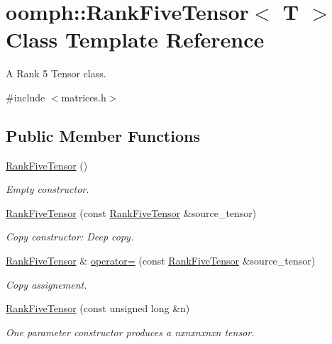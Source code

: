 \hypertarget{classoomph_1_1RankFiveTensor}{}\section{oomph\+:\+:Rank\+Five\+Tensor$<$ T $>$ Class Template Reference}
\label{classoomph_1_1RankFiveTensor}


A Rank 5 Tensor class.  




{\ttfamily \#include $<$matrices.\+h$>$}

\subsection*{Public Member Functions}
\begin{DoxyCompactItemize}
\item 
\hyperlink{classoomph_1_1RankFiveTensor_a388a9f191189d174e521d422e3bc44cd}{Rank\+Five\+Tensor} ()
\begin{DoxyCompactList}\small\item\em Empty constructor. \end{DoxyCompactList}\item 
\hyperlink{classoomph_1_1RankFiveTensor_a17aa636c6c8b4aa80ff4e168bca1881b}{Rank\+Five\+Tensor} (const \hyperlink{classoomph_1_1RankFiveTensor}{Rank\+Five\+Tensor} \&source\+\_\+tensor)
\begin{DoxyCompactList}\small\item\em Copy constructor\+: Deep copy. \end{DoxyCompactList}\item 
\hyperlink{classoomph_1_1RankFiveTensor}{Rank\+Five\+Tensor} \& \hyperlink{classoomph_1_1RankFiveTensor_a3972e47b50ce31ec0317862ce1e18884}{operator=} (const \hyperlink{classoomph_1_1RankFiveTensor}{Rank\+Five\+Tensor} \&source\+\_\+tensor)
\begin{DoxyCompactList}\small\item\em Copy assignement. \end{DoxyCompactList}\item 
\hyperlink{classoomph_1_1RankFiveTensor_a2fb5f83bfa8237882705e16ca1fbd04b}{Rank\+Five\+Tensor} (const unsigned long \&n)
\begin{DoxyCompactList}\small\item\em One parameter constructor produces a nxnxnxnxn tensor. \end{DoxyCompactList}\item 

\end{DoxyCompactItemize}
